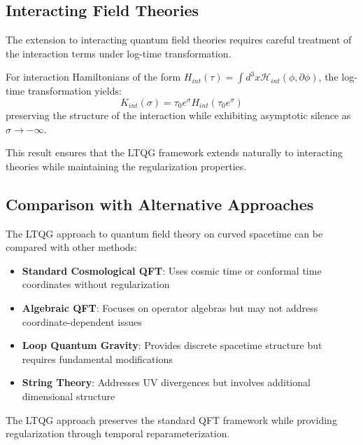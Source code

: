 \subsection{Interacting Field Theories}
\label{subsec:interacting_fields}

The extension to interacting quantum field theories requires careful treatment of the interaction terms under log-time transformation.

\begin{theorem}
\label{thm:interaction_hamiltonian}
For interaction Hamiltonians of the form $H_{int}(\tau) = \int d^3x \mathcal{H}_{int}(\phi, \partial\phi)$, the log-time transformation yields:
\begin{equation}
K_{int}(\sigma) = \tau_0 e^\sigma H_{int}(\tau_0 e^\sigma)
\end{equation}
preserving the structure of the interaction while exhibiting asymptotic silence as $\sigma \to -\infty$.
\end{theorem}

This result ensures that the LTQG framework extends naturally to interacting theories while maintaining the regularization properties.

\subsection{Comparison with Alternative Approaches}
\label{subsec:qft_alternative_approaches}

The LTQG approach to quantum field theory on curved spacetime can be compared with other methods:

\begin{itemize}
\item \textbf{Standard Cosmological QFT}: Uses cosmic time or conformal time coordinates without regularization
\item \textbf{Algebraic QFT}: Focuses on operator algebras but may not address coordinate-dependent issues
\item \textbf{Loop Quantum Gravity}: Provides discrete spacetime structure but requires fundamental modifications
\item \textbf{String Theory}: Addresses UV divergences but involves additional dimensional structure
\end{itemize}

The LTQG approach preserves the standard QFT framework while providing regularization through temporal reparameterization.

